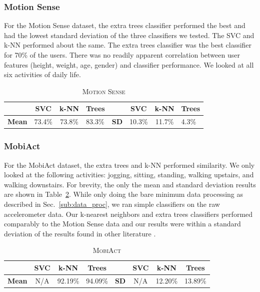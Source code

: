 \subsubsection{Motion Sense}
\label{sub:user_cross_val_motion_sense}
For the Motion Sense dataset, the extra trees classifier performed the best and had the lowest standard deviation of the three classifiers we tested. The SVC and k-NN performed about the same. The extra trees classifier was the best classifier for 70\% of the users. There was no readily apparent correlation between user features (height, weight, age, gender) and classifier performance. We looked at all six activities of daily life.

\begin{table}[H]
\caption{\textsc{Motion Sense}}
\label{tab:naive_classifiers}
\centering
\begin{tabular}{lccl||lccl}
\toprule
\multicolumn{1}{l}{\textbf{}} & \multicolumn{1}{c}{\textbf{SVC}} & \multicolumn{1}{c}{\textbf{k-NN}} & \multicolumn{1}{c}{\textbf{Trees}} & \multicolumn{1}{l}{\textbf{}} & \multicolumn{1}{c}{\textbf{SVC}} & \multicolumn{1}{c}{\textbf{k-NN}} & \multicolumn{1}{c}{\textbf{Trees}} \\ \midrule
\textbf{Mean}       & 73.4\%  & 73.8\%  & 83.3\%  &  
\textbf{SD}       & 10.3\% & 11.7\%  & 4.3\%     \\ \bottomrule
\end{tabular}
\label{tab:ms}
\end{table}


\subsubsection{MobiAct}
\label{sub:mobiact_init_res}
For the MobiAct dataset, the extra trees and k-NN performed similarity. We only looked at the following activities: jogging, sitting, standing, walking upstairs, and walking downstairs. For brevity, the only the mean and standard deviation results are shown in Table~\ref{tab:naive_mobi}. While only doing the bare minimum data processing as described in Sec.~\ref{sub:data_proc}, we ran simple classifiers on the raw accelerometer data. Our k-nearest neighbors and extra trees classifiers performed comparably to the Motion Sense data and our results were within a standard deviation of the results found in other literature \cite{ferrari2019hand}. 

\begin{table}[H]
\caption{\textsc{MobiAct}}
\label{tab:mobiact-naive}
\centering
\begin{tabular}{lccl||lccl}
\toprule
\multicolumn{1}{l}{\textbf{}} & \multicolumn{1}{c}{\textbf{SVC}} & \multicolumn{1}{c}{\textbf{k-NN}} & \multicolumn{1}{c}{\textbf{Trees}} & \multicolumn{1}{l}{\textbf{}} & \multicolumn{1}{c}{\textbf{SVC}} & \multicolumn{1}{c}{\textbf{k-NN}} & \multicolumn{1}{c}{\textbf{Trees}} \\ \midrule
\textbf{Mean}       & N/A  & 92.19\%  & 94.09\%  &  
\textbf{SD}       & N/A & 12.20\%  & 13.89\%     \\ \bottomrule
\end{tabular}
\label{tab:naive_mobi}
\end{table}



